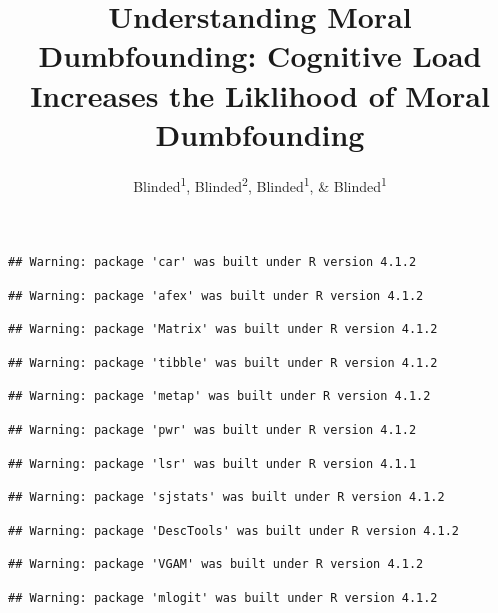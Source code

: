 \documentclass[
  american,
  man,floatsintext]{apa7}
\title{Understanding Moral Dumbfounding: Cognitive Load Increases the Liklihood of Moral Dumbfounding}
\author{Blinded\textsuperscript{1}, Blinded\textsuperscript{2}, Blinded\textsuperscript{1}, \& Blinded\textsuperscript{1}}
\date{}
\affiliation{\vspace{0.5cm}\textsuperscript{1} Blinded\\\textsuperscript{2} Blinded}
\begin{document}
\maketitle

{
\setcounter{tocdepth}{3}
\tableofcontents
}
\begin{verbatim}
## Warning: package 'car' was built under R version 4.1.2
\end{verbatim}

\begin{verbatim}
## Warning: package 'afex' was built under R version 4.1.2
\end{verbatim}

\begin{verbatim}
## Warning: package 'Matrix' was built under R version 4.1.2
\end{verbatim}

\begin{verbatim}
## Warning: package 'tibble' was built under R version 4.1.2
\end{verbatim}

\begin{verbatim}
## Warning: package 'metap' was built under R version 4.1.2
\end{verbatim}

\begin{verbatim}
## Warning: package 'pwr' was built under R version 4.1.2
\end{verbatim}

\begin{verbatim}
## Warning: package 'lsr' was built under R version 4.1.1
\end{verbatim}

\begin{verbatim}
## Warning: package 'sjstats' was built under R version 4.1.2
\end{verbatim}

\begin{verbatim}
## Warning: package 'DescTools' was built under R version 4.1.2
\end{verbatim}

\begin{verbatim}
## Warning: package 'VGAM' was built under R version 4.1.2
\end{verbatim}

\begin{verbatim}
## Warning: package 'mlogit' was built under R version 4.1.2
\end{verbatim}
\end{document}
